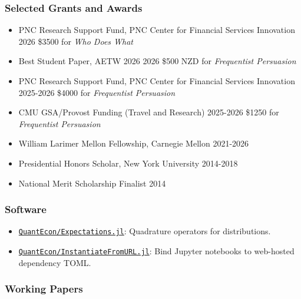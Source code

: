 \documentclass[12pt]{article}   %
\begin{document}
\subsubsection*{Selected Grants and Awards}
\begin{itemize}
  \item PNC Research Support Fund, PNC Center for Financial Services Innovation \hfill 2026
        \subitem \$3500 for \textit{Who Does What}
  \item Best Student Paper, AETW 2026 \hfill 2026
        \subitem \$500 NZD for \textit{Frequentist Persuasion}
  \item PNC Research Support Fund, PNC Center for Financial Services Innovation \hfill 2025-2026
        \subitem \$4000 for \emph{Frequentist Persuasion}
  \item CMU GSA/Provost Funding (Travel and Research) \hfill 2025-2026
        \subitem \$1250 for \textit{Frequentist Persuasion}
  \item William Larimer Mellon Fellowship, Carnegie Mellon \hfill 2021-2026
  \item Presidential Honors Scholar, New York University \hfill 2014-2018
  \item National Merit Scholarship Finalist \hfill 2014
\end{itemize}

\subsubsection*{Software}
\begin{itemize}
  \item \href{https://github.com/QuantEcon/Expectations.jl}{\texttt{QuantEcon/Expectations.jl}}: Quadrature operators for distributions.
  \item \href{https://github.com/QuantEcon/InstantiateFromURL.jl}{\texttt{QuantEcon/InstantiateFromURL.jl}}: Bind Jupyter notebooks to web-hosted dependency TOML.

\end{itemize}

\subsubsection*{Working Papers}
\hspace*{1.2cm}%
\begin{minipage}{0.9\textwidth}%
  \printbibliography[heading=none, sorting=ynt, keyword=workingpaper]
\end{minipage}%
\end{document}
